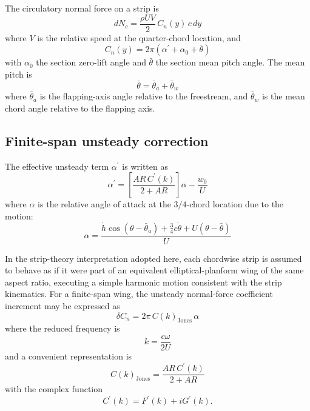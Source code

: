 \documentclass[11pt,a4paper]{article}
\begin{document}
The circulatory normal force on a strip is
\begin{equation}
dN_c=\frac{\rho U V}{2}\,C_n(y)\,c\,dy
\tag{1}\label{eq:1}
\end{equation}
where $V$ is the relative speed at the quarter-chord location, and
\begin{equation}
C_n(y)=2\pi\left(\alpha^\prime+\alpha_0+\bar{\theta}\right)
\tag{2}\label{eq:2}
\end{equation}
with $\alpha_0$ the section zero-lift angle and $\bar{\theta}$ the section mean pitch angle. The mean pitch is
\begin{equation}
\bar{\theta}=\bar{\theta}_a+\bar{\theta}_w
\tag{3}\label{eq:3}
\end{equation}
where $\bar{\theta}_a$ is the flapping-axis angle relative to the freestream, and $\bar{\theta}_w$ is the mean chord
angle relative to the flapping axis.

\subsection{Finite-span unsteady correction}
The effective unsteady term $\alpha^\prime$ is written as
\begin{equation}
\alpha^\prime=\left[\frac{AR\,C^\prime(k)}{2+AR}\right]\alpha-\frac{w_0}{U}
\tag{4}\label{eq:4}
\end{equation}
where $\alpha$ is the relative angle of attack at the $3/4$-chord location due to the motion:
\begin{equation}
\alpha=\frac{\dot{h}\cos(\theta-\bar{\theta}_a)+\frac{3}{4}c\dot{\theta}+U(\theta-\bar{\theta})}{U}
\tag{5}\label{eq:5}
\end{equation}

In the strip-theory interpretation adopted here, each chordwise strip is assumed to behave as if it were part of an
equivalent elliptical-planform wing of the same aspect ratio, executing a simple harmonic motion consistent with the
strip kinematics. For a finite-span wing, the unsteady normal-force coefficient increment may be expressed as
\begin{equation}
\delta C_n=2\pi\,C(k)_{\text{Jones}}\,\alpha
\tag{6}\label{eq:6}
\end{equation}
where the reduced frequency is
\begin{equation}
k=\frac{c\omega}{2U}
\tag{7}\label{eq:7}
\end{equation}
and a convenient representation is
\begin{equation}
C(k)_{\text{Jones}}=\frac{AR\,C^\prime(k)}{2+AR}
\tag{8}\label{eq:8}
\end{equation}
with the complex function
\begin{equation}
C^\prime(k)=F^\prime(k)+iG^\prime(k).
\tag{9}\label{eq:9}
\end{equation}
\end{document}
